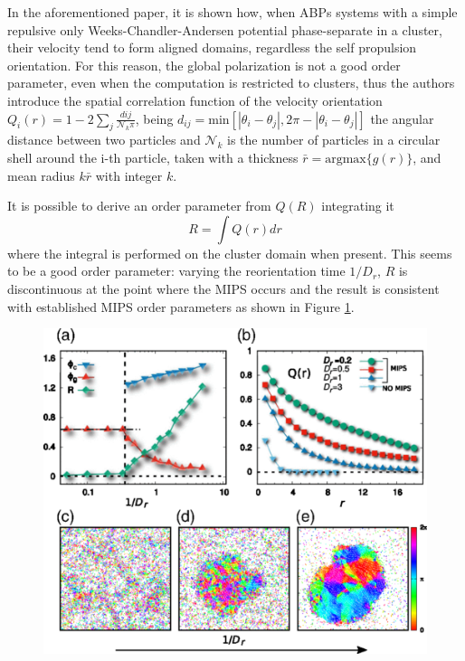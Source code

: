 \documentclass[../../master_thesis_np.tex]{subfiles}
\begin{document}
	In the aforementioned paper, it is shown how, when ABPs systems with a simple repulsive only Weeks-Chandler-Andersen potential phase-separate in a cluster, their velocity tend to form aligned domains, regardless the self propulsion orientation. For this reason, the global polarization is not a good order parameter, even when the computation is restricted to clusters, thus the authors introduce the spatial correlation function of the velocity orientation $Q_i(r) = 1-2\sum_{j} \frac{d{ij}}{\mathcal{N}_k \pi } $, being $d_{ij} = \mathrm{min}\left[|\theta_i - \theta_j|, 2 \pi - |\theta_i - \theta_j| \right]$ the angular distance between two particles and $\mathcal{N}_k$ is the number of particles in a circular shell around the i-th particle, taken with a thickness $\bar{r} = \mathrm{argmax} \{g(r)\}$, and mean radius $k\bar{r}$ with integer $k$. 
	
	It is possible to derive an order parameter from $Q(R)$ integrating it
	\begin{equation} 
	R = \int Q(r) dr 
	\end{equation}
	where the integral is performed on the cluster domain when present. 
	This seems to be a good order parameter: varying the reorientation time $1/D_r$, $R$ is discontinuous at the point where the MIPS occurs and the result is consistent with established MIPS order parameters as shown in Figure \ref{fig:caprini1}.
	
	\begin{figure}[htp]
		\centering
		\includegraphics[width=\textwidth]{caprini2.png}
		\caption{\parencite{caprini_spontaneous_2020}}
		\label{fig:caprini1}
	\end{figure}
	
\end{document}

